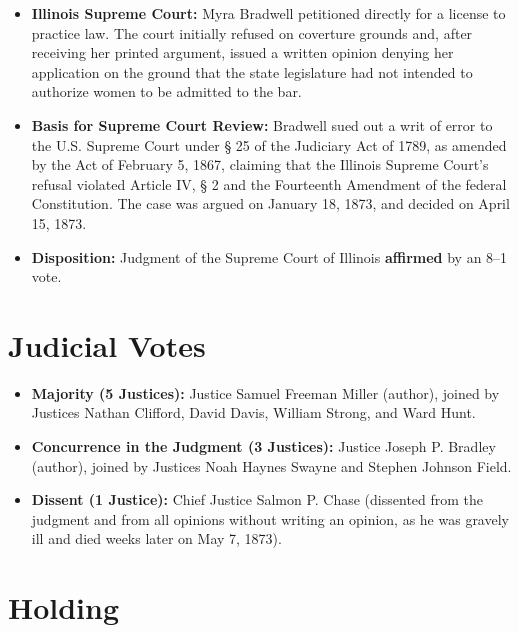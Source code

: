 \documentclass[12pt]{article}
\begin{document}
\begin{itemize}
  \item \textbf{Illinois Supreme Court:} Myra Bradwell petitioned directly for a license to practice law. The court initially refused on coverture grounds and, after receiving her printed argument, issued a written opinion denying her application on the ground that the state legislature had not intended to authorize women to be admitted to the bar.
  \item \textbf{Basis for Supreme Court Review:} Bradwell sued out a writ of error to the U.S. Supreme Court under \S{} 25 of the Judiciary Act of 1789, as amended by the Act of February 5, 1867, claiming that the Illinois Supreme Court's refusal violated Article IV, \S{} 2 and the Fourteenth Amendment of the federal Constitution. The case was argued on January 18, 1873, and decided on April 15, 1873.
  \item \textbf{Disposition:} Judgment of the Supreme Court of Illinois \textbf{affirmed} by an 8--1 vote.
\end{itemize}

\section{Judicial Votes}

\begin{itemize}
  \item \textbf{Majority (5 Justices):} Justice Samuel Freeman Miller (author), joined by Justices Nathan Clifford, David Davis, William Strong, and Ward Hunt.
  \item \textbf{Concurrence in the Judgment (3 Justices):} Justice Joseph P. Bradley (author), joined by Justices Noah Haynes Swayne and Stephen Johnson Field.
  \item \textbf{Dissent (1 Justice):} Chief Justice Salmon P. Chase (dissented from the judgment and from all opinions without writing an opinion, as he was gravely ill and died weeks later on May 7, 1873).
\end{itemize}

\section{Holding}
\end{document}
